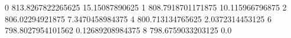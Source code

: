 0 813.8267822265625 15.15087890625
1 808.7918701171875 10.115966796875
2 806.02294921875 7.3470458984375
4 800.713134765625 2.0372314453125
6 798.8027954101562 0.12689208984375
8 798.6759033203125 0.0

